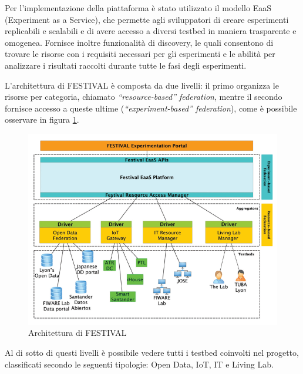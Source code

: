 Per l'implementazione della piattaforma è stato utilizzato il modello EaaS (Experiment as a Service), che permette agli sviluppatori di creare esperimenti replicabili e scalabili e di avere accesso a diversi testbed in maniera trasparente e omogenea. Fornisce inoltre funzionalità di discovery, le quali consentono di trovare le risorse con i requisiti necessari per gli esperimenti e le abilità per analizzare i risultati raccolti durante tutte le fasi degli esperimenti.

L'architettura di FESTIVAL è composta da due livelli: il primo organizza le risorse per categoria, chiamato \textit{“resource-based” federation}, mentre il secondo fornisce accesso a queste ultime (\textit{“experiment-based” federation}), come è possibile osservare in figura \ref{f:tec:festival}.

\begin{figure}[h!t]
\centerline{\includegraphics[scale=0.5]{img/festival}}
\caption{Architettura di FESTIVAL}
\label{f:tec:festival}
\end{figure}

Al di sotto di questi livelli è possibile vedere tutti i testbed coinvolti nel progetto, classificati secondo le seguenti tipologie: Open Data, IoT, IT e Living Lab. 

